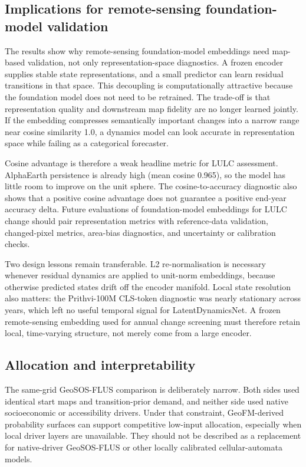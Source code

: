 \documentclass{article}
\begin{document}
\subsection{Implications for remote-sensing foundation-model validation}

The results show why remote-sensing foundation-model embeddings need map-based validation, not only representation-space diagnostics. A frozen encoder supplies stable state representations, and a small predictor can learn residual transitions in that space. This decoupling is computationally attractive because the foundation model does not need to be retrained. The trade-off is that representation quality and downstream map fidelity are no longer learned jointly. If the embedding compresses semantically important changes into a narrow range near cosine similarity 1.0, a dynamics model can look accurate in representation space while failing as a categorical forecaster.

Cosine advantage is therefore a weak headline metric for LULC assessment. AlphaEarth persistence is already high (mean cosine 0.965), so the model has little room to improve on the unit sphere. The cosine-to-accuracy diagnostic also shows that a positive cosine advantage does not guarantee a positive end-year accuracy delta. Future evaluations of foundation-model embeddings for LULC change should pair representation metrics with reference-data validation, changed-pixel metrics, area-bias diagnostics, and uncertainty or calibration checks.

Two design lessons remain transferable. L2 re-normalisation is necessary whenever residual dynamics are applied to unit-norm embeddings, because otherwise predicted states drift off the encoder manifold. Local state resolution also matters: the Prithvi-100M CLS-token diagnostic was nearly stationary across years, which left no useful temporal signal for LatentDynamicsNet. A frozen remote-sensing embedding used for annual change screening must therefore retain local, time-varying structure, not merely come from a large encoder.

\subsection{Allocation and interpretability}

The same-grid GeoSOS-FLUS comparison is deliberately narrow. Both sides used identical start maps and transition-prior demand, and neither side used native socioeconomic or accessibility drivers. Under that constraint, GeoFM-derived probability surfaces can support competitive low-input allocation, especially when local driver layers are unavailable. They should not be described as a replacement for native-driver GeoSOS-FLUS or other locally calibrated cellular-automata models.
\end{document}

